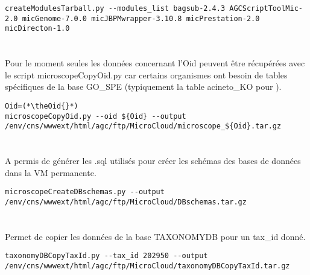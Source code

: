 \begin{lstlisting}[style=bash]
createModulesTarball.py --modules_list bagsub-2.4.3 AGCScriptToolMic-2.0 micGenome-7.0.0 micJBPMwrapper-3.10.8 micPrestation-2.0 micDirecton-1.0
\end{lstlisting}

\section{}

\begin{mycolorbox}
    Pour le moment seules les données concernant l'Oid \theOid{} peuvent être récupérées avec le script microscopeCopyOid.py car certains organismes ont besoin de tables spécifiques de la base GO\_SPE (typiquement la table acineto\_KO pour \theOrg{}).
\end{mycolorbox}

\begin{lstlisting}[style=bash]
Oid=(*\theOid{}*)
microscopeCopyOid.py --oid ${Oid} --output /env/cns/wwwext/html/agc/ftp/MicroCloud/microscope_${Oid}.tar.gz
\end{lstlisting}

\section{}
A permis de générer les .sql utilisés pour créer les schémas des bases de données dans la VM permanente.

\begin{lstlisting}[style=bash]
microscopeCreateDBschemas.py --output /env/cns/wwwext/html/agc/ftp/MicroCloud/DBschemas.tar.gz
\end{lstlisting}

\section{}
Permet de copier les données de la base TAXONOMYDB pour un tax\_id donné.

\begin{lstlisting}[style=bash]
taxonomyDBCopyTaxId.py --tax_id 202950 --output /env/cns/wwwext/html/agc/ftp/MicroCloud/taxonomyDBCopyTaxId.tar.gz
\end{lstlisting}
